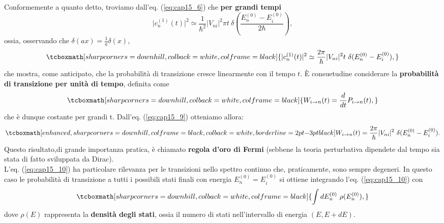 \documentclass[a4paper,12pt,oneside]{book}
\begin{document}
Conformemente a quanto detto, troviamo dall'eq. (\ref{eq:cap15_6}) che \textbf{per grandi tempi}
	\begin{equation}
		\vert c_n ^{(1)} (t) \vert ^2 \simeq \frac{1}{\hbar ^2} \vert V_{ni} \vert ^2 \pi t\ \delta\left(\frac{E_n ^{(0)}-E_i ^{(0)}}{2\hbar} \right),
	\end{equation}
ossia, osservando che $\delta (ax) = \frac{1}{a} \delta (x)$,
	\begin{equation}
		\tcboxmath[sharp corners=downhill, colback=white, colframe=black]{
			\vert c_n ^{(1)} (t) \vert ^2 \simeq \frac{2\pi}{\hbar } \vert V_{ni} \vert ^2  t\ \delta (E_n ^{(0)}-E_i ^{(0)} ),
			}
	\label{eq:cap15_9}
	\end{equation}
che mostra, come anticipato, che la probabilità di transizione cresce linearmente con il tempo $t$. È consuetudine considerare la \textbf{probabilità di transizione per unità di tempo}, definita come
	\begin{equation}
		\tcboxmath[sharp corners=downhill, colback=white, colframe=black]{
			W_{i\rightarrow n} (t) =\frac{d}{dt} P_{i\rightarrow n} (t),
			}
	\end{equation}
che è dunque costante per grandi t. Dall'eq. (\ref{eq:cap15_9}) otteniamo allora:
	\begin{equation}
		\tcboxmath[enhanced, sharp corners=downhill, colframe=black, colback=white, borderline={2pt}{-3pt}{black}]{
			W_{i\rightarrow n} (t) = \frac{2\pi}{\hbar } \vert V_{ni} \vert ^2\ \delta (E_n ^{(0)}-E_i ^{(0)} ).
			}
	\label{eq:cap15_10}
	\end{equation}
Questo risultato,di grande importanza pratica, è chiamato \textbf{regola d'oro di Fermi} (sebbene la teoria perturbativa dipendete dal tempo sia stata di fatto sviluppata da Dirac).\\
		
L'eq. (\ref{eq:cap15_10}) ha particolare rilevanza per le transizioni nello spettro continuo che, praticamente, sono sempre degeneri. In questo caso le probabilità di transizione a tutti i possibili stati finali con energia $E_n ^{(0)}= E_i ^{(0)}$ si ottiene integrando l'eq. (\ref{eq:cap15_10}) con
	\begin{equation}
		\tcboxmath[sharp corners=downhill, colback=white, colframe=black]{
			\int dE_n ^{(0)} \ \rho (E_n ^{(0)}),
			}
	\end{equation}
dove $\rho (E)$ rappresenta la \textbf{densità degli stati}, ossia il numero di stati nell'intervallo di energia $(E, E+dE)$.
\end{document}
